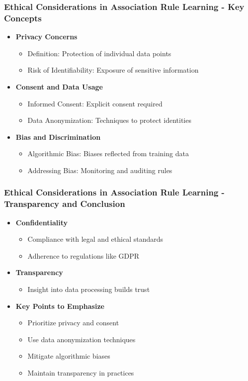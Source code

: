 \documentclass{beamer}
\begin{document}
\begin{frame}[fragile]
    \frametitle{Ethical Considerations in Association Rule Learning - Key Concepts}
    \begin{itemize}
        \item \textbf{Privacy Concerns}
            \begin{itemize}
                \item Definition: Protection of individual data points
                \item Risk of Identifiability: Exposure of sensitive information
            \end{itemize}
        \item \textbf{Consent and Data Usage}
            \begin{itemize}
                \item Informed Consent: Explicit consent required
                \item Data Anonymization: Techniques to protect identities
            \end{itemize}
        \item \textbf{Bias and Discrimination}
            \begin{itemize}
                \item Algorithmic Bias: Biases reflected from training data
                \item Addressing Bias: Monitoring and auditing rules
            \end{itemize}
    \end{itemize}
\end{frame}

\begin{frame}[fragile]
    \frametitle{Ethical Considerations in Association Rule Learning - Transparency and Conclusion}
    \begin{itemize}
        \item \textbf{Confidentiality}
            \begin{itemize}
                \item Compliance with legal and ethical standards
                \item Adherence to regulations like GDPR
            \end{itemize}
        \item \textbf{Transparency}
            \begin{itemize}
                \item Insight into data processing builds trust
            \end{itemize}
        \item \textbf{Key Points to Emphasize}
            \begin{itemize}
                \item Prioritize privacy and consent
                \item Use data anonymization techniques
                \item Mitigate algorithmic biases
                \item Maintain transparency in practices
            \end{itemize}
    \end{itemize}
\end{frame}
\end{document}
